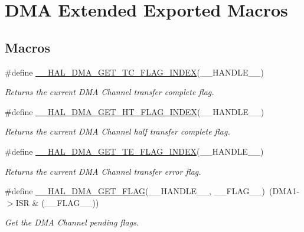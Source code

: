 \hypertarget{group___d_m_a_ex___exported___macros}{\section{D\-M\-A Extended Exported Macros}
\label{group___d_m_a_ex___exported___macros}
}
\subsection*{Macros}
\begin{DoxyCompactItemize}
\item 
\#define \hyperlink{group___d_m_a_ex___exported___macros_gae3feef5ea50ff13a6a5b98cb353c87b0}{\-\_\-\-\_\-\-H\-A\-L\-\_\-\-D\-M\-A\-\_\-\-G\-E\-T\-\_\-\-T\-C\-\_\-\-F\-L\-A\-G\-\_\-\-I\-N\-D\-E\-X}(\-\_\-\-\_\-\-H\-A\-N\-D\-L\-E\-\_\-\-\_\-)
\begin{DoxyCompactList}\small\item\em Returns the current D\-M\-A Channel transfer complete flag. \end{DoxyCompactList}\item 
\#define \hyperlink{group___d_m_a_ex___exported___macros_ga0095f5f3166a82bedc67744ac94acfba}{\-\_\-\-\_\-\-H\-A\-L\-\_\-\-D\-M\-A\-\_\-\-G\-E\-T\-\_\-\-H\-T\-\_\-\-F\-L\-A\-G\-\_\-\-I\-N\-D\-E\-X}(\-\_\-\-\_\-\-H\-A\-N\-D\-L\-E\-\_\-\-\_\-)
\begin{DoxyCompactList}\small\item\em Returns the current D\-M\-A Channel half transfer complete flag. \end{DoxyCompactList}\item 
\#define \hyperlink{group___d_m_a_ex___exported___macros_ga5e765bb3b1c5fc9f1b1abbbb764250bc}{\-\_\-\-\_\-\-H\-A\-L\-\_\-\-D\-M\-A\-\_\-\-G\-E\-T\-\_\-\-T\-E\-\_\-\-F\-L\-A\-G\-\_\-\-I\-N\-D\-E\-X}(\-\_\-\-\_\-\-H\-A\-N\-D\-L\-E\-\_\-\-\_\-)
\begin{DoxyCompactList}\small\item\em Returns the current D\-M\-A Channel transfer error flag. \end{DoxyCompactList}\item 
\#define \hyperlink{group___d_m_a_ex___exported___macros_ga798d4b3b3fbd32b95540967bb35b35be}{\-\_\-\-\_\-\-H\-A\-L\-\_\-\-D\-M\-A\-\_\-\-G\-E\-T\-\_\-\-F\-L\-A\-G}(\-\_\-\-\_\-\-H\-A\-N\-D\-L\-E\-\_\-\-\_\-, \-\_\-\-\_\-\-F\-L\-A\-G\-\_\-\-\_\-)~(D\-M\-A1-\/$>$I\-S\-R \& (\-\_\-\-\_\-\-F\-L\-A\-G\-\_\-\-\_\-))
\begin{DoxyCompactList}\small\item\em Get the D\-M\-A Channel pending flags. \end{DoxyCompactList}\item 

\end{DoxyCompactItemize}
